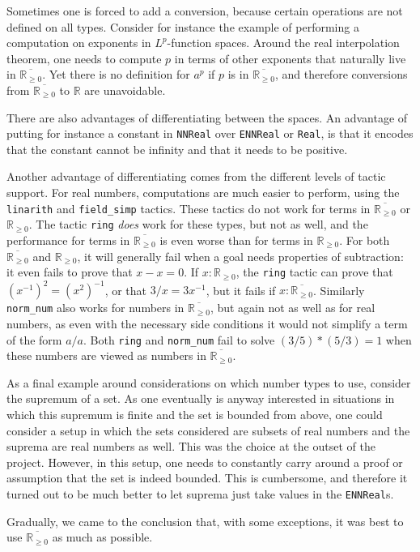 \documentclass[12pt]{amsart}
\newcommand*{\real}{\mathbb{R}} %
\newcommand{\nnreal}{\real_{\ge0}}
\newcommand{\ennreal}{\overline{\real_{\ge0}}}
\begin{document}
Sometimes one is forced to add a conversion, because certain operations are not defined on all types.
Consider for instance the example of performing a computation on exponents in $L^p$-function spaces.
Around the real interpolation theorem, one needs to compute $p$ in terms of other exponents that
naturally live in $\ennreal$.
Yet there is no definition for $a^p$ if $p$ is in $\ennreal$, and therefore conversions from
$\ennreal$ to $\real$ are unavoidable.

There are also advantages of differentiating between the spaces.
An advantage of putting for instance a constant in \texttt{NNReal} over \texttt{ENNReal} or
\texttt{Real}, is that it encodes that the constant cannot be infinity and that it needs to be positive.

Another advantage of differentiating comes from the different levels of tactic support.
For real numbers, computations are much easier to perform, using the \texttt{linarith} and \texttt{field\_simp} tactics.
These tactics do not work for terms in $\ennreal$ or $\nnreal$.
The tactic \texttt{ring} \emph{does} work for these types, but not as well, and the performance for terms in $\ennreal$ is even worse than for terms in $\nnreal$.
For both $\ennreal$ and $\nnreal$, it will generally fail when a goal needs properties of subtraction: it even fails to prove that $x - x = 0$. If $x : \nnreal$, the \texttt{ring} tactic can prove that $(x^{-1})^2 = (x ^ 2)^{-1}$, or that $3 / x = 3 x^{-1}$, but it fails if $x : \ennreal$.
Similarly \texttt{norm\_num} also works for numbers in $\ennreal$, but again not as well as for real numbers,
as even with the necessary side conditions it would not simplify a term of the form $a / a$. Both \texttt{ring} and \texttt{norm\_num} fail to solve $(3/5) * (5/3) = 1$ when these numbers are viewed as numbers in $\ennreal$.

As a final example around considerations on which number types to use,
consider the supremum of a set.
As one eventually is anyway interested in situations in which this supremum is finite and the set
is bounded from above, one could consider a setup in which the sets considered are subsets of
real numbers and the suprema are real numbers as well.
This was the choice at the outset of the project.
However, in this setup, one needs to constantly carry around a proof or assumption that the
set is indeed bounded.
This is cumbersome, and therefore it turned out to be much better to
let suprema just take values in the \texttt{ENNReal}s.

Gradually, we came to the conclusion that, with some exceptions, it was best to use $\ennreal$ as much as possible.
\end{document}
